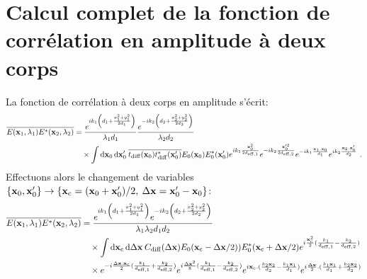 \section{Calcul complet de la fonction de corrélation en amplitude à deux corps}
La fonction de corrélation à deux corps en amplitude s'écrit:
\begin{align}
\overline{E(\mathbf{x}_1,\lambda_1)E^*(\mathbf{x}_2,\lambda_2)} &= \frac{e^{ik_1 \left( d_1+\frac{x_1^2+y_1^2}{2d_1} \right)}}{\lambda_1 d_1} \frac{e^{-i k_2 \left( d_2+ \frac{x_2^2+y_2^2}{2d_2} \right)}}{\lambda_2 d_2} \\
\nonumber & \quad \times \int{\mathop{}\mathopen{}\mathrm{d}\mathbf{x}_0\mathop{}\mathopen{}\mathrm{d}\mathbf{x}_0' \: \overline{t_{\mathrm{diff}}(\mathbf{x}_0)t_{\mathrm{diff}}^*(\mathbf{x}_0')} E_0(\mathbf{x}_0) E_0^*(\mathbf{x}_0') e^{ik_1\frac{ \mathbf{x}_0^2}{2d_{\mathrm{eff,1}}}} e^{-ik_2\frac{ \mathbf{x}_0'^2}{2d_{\mathrm{eff,2}}}} e^{-ik_1 \frac{\mathbf{x}_1 . \mathbf{x}_0}{d_1}} e^{ik_2 \frac{\mathbf{x}_2 . \mathbf{x}_0'}{d_2}}} \text{ .}
\end{align}
Effectuons alors le changement de variables $\lbrace \mathbf{x}_0,\mathbf{x}_0' \rbrace\rightarrow \lbrace \mathbf{x}_{\mathrm{c}}=(\mathbf{x}_0+\mathbf{x}_0')/2 ,\: \Delta\mathbf{x}=\mathbf{x}_0'-\mathbf{x}_0 \rbrace$:
\begin{align}
\overline{E(\mathbf{x}_1,\lambda_1)E^*(\mathbf{x}_2,\lambda_2)} &= \frac{e^{ik_1\left( d_1 + \frac{x_1^2+y_1^2}{2d_1} \right)} e^{-ik_2 \left( d_2 + \frac{x_2^2+y_2^2}{2d_2}\right)}}{\lambda_1 \lambda_2 d_1 d_2} \\
\nonumber & \quad \times \int{\mathop{}\mathopen{}\mathrm{d}\mathbf{x}_{\mathrm{c}}\mathop{}\mathopen{}\mathrm{d}\Delta\mathbf{x}\: C_{\mathrm{diff}}(\Delta\mathbf{x}) E_0(\mathbf{x}_{\mathrm{c}}-\Delta\mathbf{x}/2))E_0^*(\mathbf{x}_{\mathrm{c}}+\Delta\mathbf{x}/2)} e^{i\frac{\mathbf{x}_{\mathrm{c}}^2}{2} (\frac{k_1}{d_{\mathrm{eff,1}}} - \frac{k_2}{d_{\mathrm{eff,2}}})}\\
\nonumber & \quad \times  e^{-i \frac{\Delta\mathbf{x} . \mathbf{x}_{\mathrm{c}}}{2} ( \frac{k_1}{d_{\mathrm{eff,1}}} + \frac{k_2}{d_{\mathrm{eff,2}}})} e^{i \frac{\Delta\mathbf{x}^2}{8}(\frac{k_1}{d_{\mathrm{eff,1}}} - \frac{k_2}{d_{\mathrm{eff,2}}})} e^{i\mathbf{x}_{\mathrm{c}}.(\frac{k_2 \mathbf{x}_2}{d_2} - \frac{k_1 \mathbf{x}_1}{d_1})} e^{i\frac{\Delta\mathbf{x}}{2} . (\frac{k_1 \mathbf{x}_1}{d_1} + \frac{k_2 \mathbf{x}_2}{d_2})}
\end{align}

